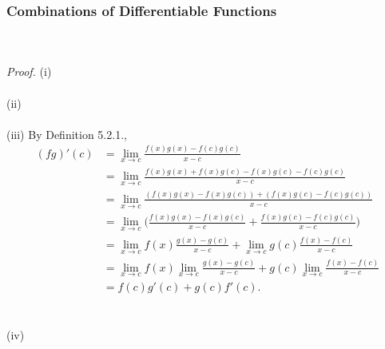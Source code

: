 \documentclass{article}
\begin{document}
            \subsubsection{Combinations of Differentiable Functions}
            \\ \\
            \textit{Proof.} (i) 
            \\ \\
            (ii)
            \\ \\
            (iii) By Definition 5.2.1.,
            \begin{align*}
                (fg)'(c) &= \lim_{x \to c} \frac{f(x)g(x)-f(c)g(c)}{x-c} \\
                & = \lim_{x \to c} \frac{f(x)g(x) + f(x)g(c) - f(x)g(c) - f(c)g(c)}{x-c} \\
                & = \lim_{x \to c} \frac{(f(x)g(x) - f(x)g(c)) + (f(x)g(c) - f(c)g(c))}{x-c} \\
                & = \lim_{x \to c} \bigg(\frac{f(x)g(x)-f(x)g(c)}{x-c}+\frac{f(x)g(c)-f(c)g(c)}{x-c}\bigg) \\
                & = \lim_{x \to c}f(x)\frac{g(x)-g(c)}{x-c}+\lim_{x \to c}g(c)\frac{f(x)-f(c)}{x-c} \\
                & = \lim_{x \to c}f(x) \lim_{x \to c}\frac{g(x)-g(c)}{x-c} + g(c)\lim_{x \to c}\frac{f(x)-f(c)}{x-c} \\
                & = f(c)g'(c) + g(c)f'(c).
            \end{align*}
            \\ \\
            (iv)
            \\ \\
\end{document}

